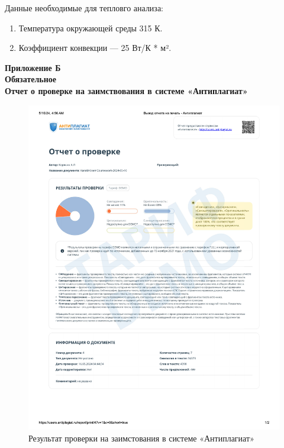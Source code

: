 Данные необходимые для тепловго анализа:
\begin{enumerate}[label={\arabic*.}]
\item Температура окружающей среды 315 К.
\item Коэффициент конвекции — 25 Вт/К * м².
\end{enumerate}

\newpage


\begin{center}
\textbf{Приложение Б}\\
\textbf{Обязательное}\\
\textbf{Отчет о проверке на заимствования в системе «Антиплагиат»}

\begin{figure}[H]
  \centering
  \includegraphics[scale=0.7]{../img/antiplagiat.pdf}
  \caption{Результат проверки на заимстования в системе «Антиплагиат»}
\end{figure}
\end{center}